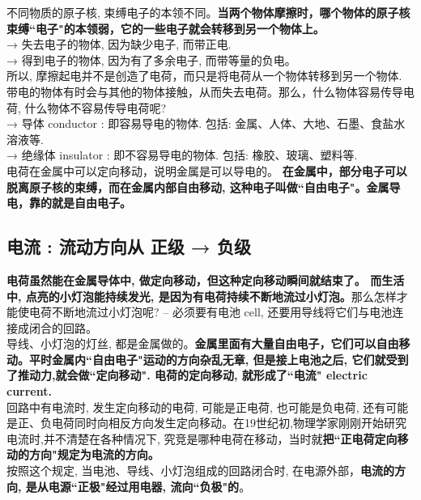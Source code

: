 \documentclass[UTF8]{ctexart}
\begin{document}
	不同物质的原子核, 束缚电子的本领不同。\textbf{当两个物体摩擦时，哪个物体的原子核束缚``电子"的本领弱，它的一些电子就会转移到另一个物体上。} \\
	→ 失去电子的物体, 因为缺少电子, 而带正电. \\
	→ 得到电子的物体, 因为有了多余电子, 而带等量的负电。 \\
	所以, 摩擦起电并不是创造了电荷，而只是将电荷从一个物体转移到另一个物体. \\
	
	
	带电的物体有时会与其他的物体接触，从而失去电荷。那么，什么物体容易传导电荷, 什么物体不容易传导电荷呢? \\			
	→ 导体 conductor : 即容易导电的物体. 包括: 金属、人体、大地、石墨、食盐水溶液等. \\
	→ 绝缘体 insulator : 即不容易导电的物体. 包括: 橡胶、玻璃、塑料等. \\
	
	电荷在金属中可以定向移动，说明金属是可以导电的。 \textbf{在金属中，部分电子可以脱离原子核的束缚，而在金属内部自由移动, 这种电子叫做``自由电子"。金属导电，靠的就是自由电子。} \\	
	
	\vspace{1em} 
	
	
	\subsection{电流 : 流动方向从 正级 → 负级}
	
	\textbf{电荷虽然能在金属导体中, 做定向移动，但这种定向移动瞬间就结束了。 而生活中, 点亮的小灯泡能持续发光, 是因为有电荷持续不断地流过小灯泡。}那么怎样才能使电荷不断地流过小灯泡呢?  -- 必须要有电池 cell, 还要用导线将它们与电池连接成闭合的回路。	\\	

	导线、小灯泡的灯丝, 都是金属做的。\textbf{金属里面有大量自由电子，它们可以自由移动。平时金属内``自由电子"运动的方向杂乱无章, 但是接上电池之后, 它们就受到了推动力,就会做``定向移动". 电荷的定向移动, 就形成了``电流" electric current.} \\
	
	回路中有电流时, 发生定向移动的电荷, 可能是正电荷, 也可能是负电荷, 还有可能是正、负电荷同时向相反方向发生定向移动。在19世纪初,物理学家刚刚开始研究电流时,并不清楚在各种情况下, 究竞是哪种电荷在移动，当时就\textbf{把``正电荷定向移动的方向"规定为电流的方向。} \\
	按照这个规定, 当电池、导线、小灯泡组成的回路闭合时, 在电源外部，\textbf{电流的方向, 是从电源``正极"经过用电器, 流向``负极"的}。 \\
	
\end{document}
